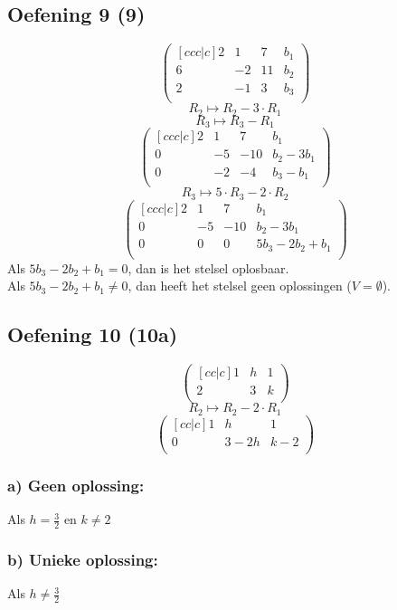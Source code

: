 \documentclass[lineaire_algebra_oplossingen.tex]{subfiles}
\begin{document}
\subsection{Oefening 9 (9) }
\[
\begin{pmatrix}[ccc|c]
2 &  1 &  7 & b_1\\
6 & -2 & 11 & b_2 \\
2 & -1 &  3 & b_3\\
\end{pmatrix}
\]
\[ R_2 \longmapsto R_2 -3\cdot R_1\]
\[ R_3 \longmapsto R_3 - R_1\]
\[
\begin{pmatrix}[ccc|c]
2 &  1 &  7 & b_1\\
0 & -5 & -10& b_2-3b_1 \\
0 & -2 &  -4& b_3-b_1\\
\end{pmatrix}
\]
\[ R_3 \longmapsto 5 \cdot R_3 - 2 \cdot R_2\]
\[
\begin{pmatrix}[ccc|c]
2 &  1 &  7 & b_1\\
0 & -5 & -10& b_2-3b_1 \\
0 & 0  &  0 & 5b_3-2b_2+b_1\\
\end{pmatrix}
\]
Als $5b_3-2b_2+b_1 = 0$, dan is het stelsel oplosbaar.\\
Als $5b_3-2b_2+b_1 \neq 0$, dan heeft het stelsel geen oplossingen ($V=\emptyset$).

\subsection{Oefening 10 (10a) }
\[
\begin{pmatrix}[cc|c]
1 & h & 1\\
2 & 3 & k\\
\end{pmatrix}
\]
\[ R_2 \longmapsto R_2 - 2 \cdot R_1\]
\[
\begin{pmatrix}[cc|c]
1 & h & 1\\
0 & 3-2h & k-2\\
\end{pmatrix}
\]
\subsubsection*{a) Geen oplossing:}
Als $h = \frac{3}{2}$ en $k \neq 2$
\subsubsection*{b) Unieke oplossing:}
Als $h \neq \frac{3}{2}$
\end{document}
